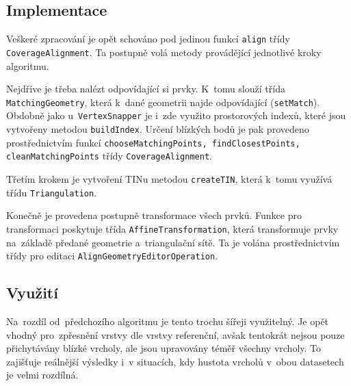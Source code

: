 



\subsection{Implementace} %
\label{ca-implementace}
Veškeré zpracování je opět schováno pod jedinou funkcí \texttt{align} třídy
\texttt{Coverage\-Alignment}. Ta postupně volá metody provádějící jednotlivé
kroky algoritmu.

Nejdříve je třeba nalézt odpovídající si prvky. K~tomu slouží třída 
\texttt{Matching\-Geometry}, která k~dané geometrii najde odpovídající
(\texttt{set\-Match}). Obdobně jako u~\texttt{Vertex\-Snapper} je i~zde 
využito prostorových indexů, které jsou vytvořeny metodou 
\texttt{build\-Index}. Určení blízkých bodů je pak provedeno prostřednictvím
funkcí \texttt{choose\-Matching\-Points, \-find\-Closest\-Points,
\-clean\-Matching\-Points} třídy \texttt{Co\-ve\-ra\-ge\-Align\-ment}.

Třetím krokem je vytvoření TINu metodou \texttt{create\-TIN}, která k~tomu
využívá třídu \texttt{Tri\-an\-gu\-la\-tion}.  

Konečně je provedena postupně transformace všech prvků. Funkce pro
transformaci poskytuje třída \texttt{Affine\-Trans\-for\-mation},
která transformuje prvky na~základě předané geometrie a~triangulační
sítě. Ta je volána prostřednictvím třídy pro editaci 
\texttt{Align\-Geo\-metry\-Edi\-tor\-Ope\-ra\-tion}.


\subsection{Využití}
\label{ca-vyuziti}

Na~rozdíl od~předchozího algoritmu je tento trochu šířeji využitelný. Je opět 
vhodný pro~zpřesnění vrstvy dle vrstvy referenční, avšak tentokrát nejsou 
pouze přichytávány blízké vrcholy, ale jsou upravovány téměř všechny vrcholy. 
To zajišťuje reálnější výsledky i~v situacích, kdy hustota vrcholů v~obou 
datasetech je velmi rozdílná.

